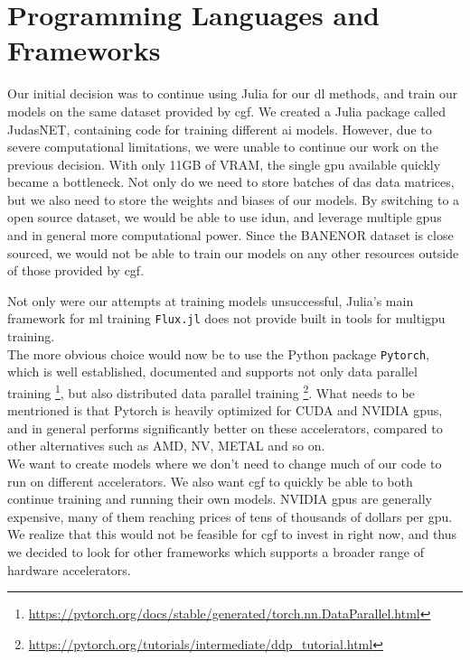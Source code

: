 \section{Programming Languages and Frameworks}

Our initial decision was to continue using Julia for our \acrshort{dl} methods, and train our models on the same dataset provided by \acrshort{cgf}. We created a Julia package called JudasNET, containing code for training different \acrshort{ai} models. However, due to severe computational limitations, we were unable to continue our work on the previous decision. With only 11GB of VRAM, the single \acrshort{gpu} available quickly became a bottleneck. Not only do we need to store batches of \acrshort{das} data matrices, but we also need to store the weights and biases of our models. By switching to a open source dataset, we would be able to use \Gls{idun}, and leverage multiple \acrshort{gpu}s and in general more computational power. Since the BANENOR dataset is close sourced, we would not be able to train our models on any other resources outside of those provided by \acrshort{cgf}.

Not only were our attempts at training models unsuccessful, Julia's main framework for \acrshort{ml} training \texttt{Flux.jl} does not provide built in tools for multigpu training. \\  

The more obvious choice would now be to use the Python package \texttt{Pytorch}, which is well established, documented and supports not only data parallel training \footnote{  \href{https://pytorch.org/docs/stable/generated/torch.nn.DataParallel.html}{https://pytorch.org/docs/stable/generated/torch.nn.DataParallel.html}}, but also distributed data parallel training \footnote{\href{https://pytorch.org/tutorials/intermediate/ddp_tutorial.html}{https://pytorch.org/tutorials/intermediate/ddp\_tutorial.html}}. What needs to be mentrioned is that Pytorch is heavily optimized for CUDA and NVIDIA \acrshort{gpu}s, and in general performs significantly better on these accelerators, compared to other alternatives such as AMD, NV, METAL and so on. \\ 

We want to create models where we don't need to change much of our code to run on different accelerators. We also want \acrshort{cgf} to  quickly be able to both continue training and running their own models. NVIDIA \acrshort{gpu}s are generally expensive, many of them reaching prices of tens of thousands of dollars per \acrshort{gpu}. We realize that this would not be feasible for \acrshort{cgf} to invest in right now, and thus we decided to look for other frameworks which supports a broader range of hardware accelerators. \\ 

